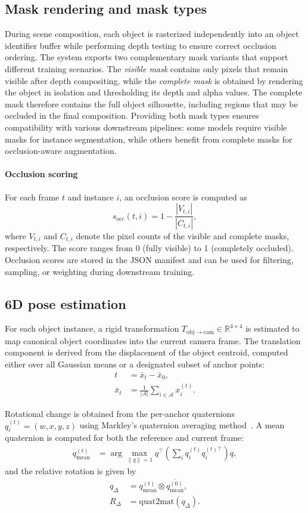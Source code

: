 \subsection{Mask rendering and mask types}
During scene composition, each object is rasterized independently into an object identifier buffer while performing depth testing to ensure correct occlusion ordering. The system exports two complementary mask variants that support different training scenarios. The \emph{visible mask} contains only pixels that remain visible after depth compositing, while the \emph{complete mask} is obtained by rendering the object in isolation and thresholding its depth and alpha values. The complete mask therefore contains the full object silhouette, including regions that may be occluded in the final composition. Providing both mask types ensures compatibility with various downstream pipelines: some models require visible masks for instance segmentation, while others benefit from complete masks for occlusion-aware augmentation.

\paragraph{Occlusion scoring}
For each frame \(t\) and instance \(i\), an occlusion score is computed as
\[
s_{\mathrm{occ}}(t,i) = 1 - \frac{|V_{t,i}|}{|C_{t,i}|},
\]
where \(V_{t,i}\) and \(C_{t,i}\) denote the pixel counts of the visible and complete masks, respectively. The score ranges from 0 (fully visible) to 1 (completely occluded). Occlusion scores are stored in the JSON manifest and can be used for filtering, sampling, or weighting during downstream training.

\subsection{6D pose estimation}
For each object instance, a rigid transformation 
$T_{\mathrm{obj}\rightarrow\mathrm{cam}} \in \mathbb{R}^{4\times4}$ 
is estimated to map canonical object coordinates into the current camera frame. 
The translation component is derived from the displacement of the object centroid, 
computed either over all Gaussian means or a designated subset of anchor points:
\begin{align}
t &= \bar{x}_{t} - \bar{x}_{0}, \\
\bar{x}_{t} &= \frac{1}{|\mathcal{A}|} \sum_{i \in \mathcal{A}} x_i^{(t)}.
\end{align}

Rotational change is obtained from the per-anchor quaternions 
$q_i^{(t)} = (w,x,y,z)$ using Markley’s quaternion averaging method~\cite{markley2007averaging}. 
A mean quaternion is computed for both the reference and current frame:
\begin{align}
q^{(t)}_{\mathrm{mean}} &= 
\arg\max_{\|q\|=1} q^\top
\left(\sum_i q_i^{(t)} q_i^{(t)\top}\right) q,
\end{align}
and the relative rotation is given by
\begin{align}
q_{\Delta} &= q^{(t)}_{\mathrm{mean}} \otimes \overline{q^{(0)}_{\mathrm{mean}}}, \\
R_{\Delta} &= \mathrm{quat2mat}(q_{\Delta}).
\end{align}

